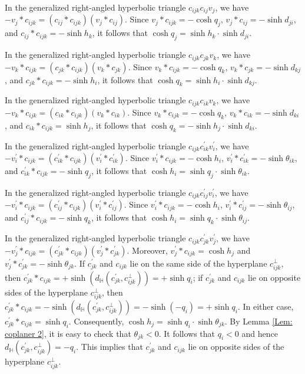 \documentclass[12pt]{amsart}
\theoremstyle{definition}
\begin{document}
In the generalized right-angled hyperbolic triangle $c_{ijk}c_{ij}v_j$,
we have $-v_j\ast c_{ijk}=(c_{ij}\ast c_{ijk})(v_j\ast c_{ij})$.
Since $v_j\ast c_{ijk}=-\cosh q_j$,
$v_j\ast c_{ij}=-\sinh d_{ji}$,
and $c_{ij}\ast c_{ijk}=-\sinh h_k$,
it follows that $\cosh q_j=\sinh h_k\cdot \sinh d_{ji}$.

In the generalized right-angled hyperbolic triangle $c_{ijk}c_{jk}v_k$,
we have $-v_k\ast c_{ijk}=(c_{jk}\ast c_{ijk})(v_k\ast c_{jk})$.
Since $v_k\ast c_{ijk}=-\cosh q_k$,
$v_k\ast c_{jk}=-\sinh d_{kj}$,
and $c_{jk}\ast c_{ijk}=-\sinh h_i$,
it follows that $\cosh q_k=\sinh h_i\cdot \sinh d_{kj}$.

In the generalized right-angled hyperbolic triangle $c_{ijk}c_{ik}v_k$,
we have $-v_k\ast c_{ijk}=(c_{ik}\ast c_{ijk})(v_k\ast c_{ik})$.
Since $v_k\ast c_{ijk}=-\cosh q_k$,
$v_k\ast c_{ik}=-\sinh d_{ki}$, and
$c_{ik}\ast c_{ijk}=\sinh h_j$,
it follows that $\cosh q_k=-\sinh h_j\cdot\sinh d_{ki}$.

In the generalized right-angled hyperbolic triangle $c_{ijk}c^\prime_{ik}v^\prime_i$,
we have $-v^\prime_i\ast c_{ijk}=(c^\prime_{ik}\ast c_{ijk})(v^\prime_i\ast c^\prime_{ik})$.
Since $v^\prime_i\ast c_{ijk}=-\cosh h_i$,
$v^\prime_i\ast c^\prime_{ik}=-\sinh \theta_{ik}$, and
$c^\prime_{ik}\ast c_{ijk}=-\sinh q_j$,
it follows that $\cosh h_i=\sinh q_j\cdot\sinh \theta_{ik}$.

In the generalized right-angled hyperbolic triangle $c_{ijk}c^\prime_{ij}v^\prime_i$,
we have $-v^\prime_i\ast c_{ijk}=(c^\prime_{ij}\ast c_{ijk})(v^\prime_i\ast c^\prime_{ij})$.
Since $v^\prime_i\ast c_{ijk}=-\cosh h_i$,
$v^\prime_i\ast c^\prime_{ij}=-\sinh \theta_{ij}$, and
$c^\prime_{ij}\ast c_{ijk}=-\sinh q_k$,
it follows that $\cosh h_i=\sinh q_k\cdot\sinh \theta_{ij}$.

In the generalized right-angled hyperbolic triangle $c_{ijk}c^\prime_{jk}v^\prime_j$,
we have $-v^\prime_j\ast c_{ijk}=(c^\prime_{jk}\ast c_{ijk})(v^\prime_j\ast c^\prime_{jk})$.
Moreover, $v^\prime_j\ast c_{ijk}=\cosh h_j$ and
$v^\prime_j\ast c^\prime_{jk}=-\sinh \theta_{jk}$.
If $c^\prime_{jk}$ and $c_{ijk}$ lie on the same side of the hyperplane $c_{ijk}^\bot$,
then $c^\prime_{jk}\ast c_{ijk}=+\sinh(d_\mathbb{H}(c^\prime_{jk},c_{ijk}^\bot))
=+\sinh q_i$;
if $c^\prime_{jk}$ and $c_{ijk}$ lie on opposite sides of the hyperplane $c_{ijk}^\bot$, then $c^\prime_{jk}\ast c_{ijk}=-\sinh(d_\mathbb{H}(c^\prime_{jk},c_{ijk}^\bot))
=-\sinh (-q_i)=+\sinh q_i$.
In either case, $c^\prime_{jk}\ast c_{ijk}=\sinh q_i$.
Consequently, $\cosh h_j=\sinh q_i\cdot\sinh \theta_{jk}$.
By Lemma \ref{Lem: coplaner 2}, it is easy to check that $\theta_{jk}<0$.
It follows that $q_i<0$ and hence
$d_\mathbb{H}(c^\prime_{jk},c_{ijk}^\bot)=-q_i$.
This implies that $c^\prime_{jk}$ and $c_{ijk}$ lie on opposite sides of the hyperplane $c_{ijk}^\bot$.
\end{document}

